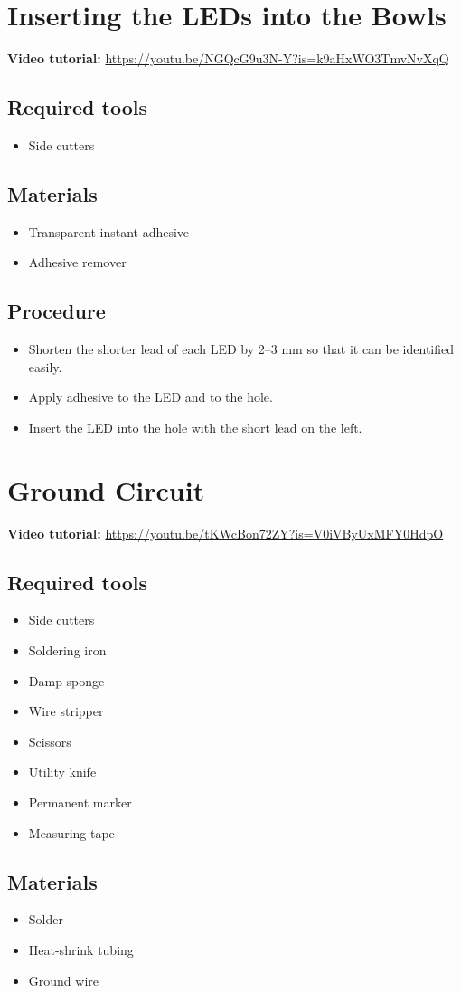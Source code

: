 \documentclass[11pt,a4paper]{article}
\newcommand{\tutorial}[1]{\textbf{Video tutorial:} \url{#1}}
\newcommand{\tools}{\subsection{Required tools}}
\newcommand{\materials}{\subsection{Materials}}
\newcommand{\procedure}{\subsection{Procedure}}
\begin{document}
\section{Inserting the LEDs into the Bowls}
\tutorial{https://youtu.be/NGQcG9u3N-Y?is=k9aHxWO3TmvNvXqQ}

\tools
\begin{itemize}
  \item Side cutters
\end{itemize}

\materials
\begin{itemize}
  \item Transparent instant adhesive
  \item Adhesive remover
\end{itemize}

\procedure
\begin{itemize}
  \item Shorten the shorter lead of each LED by 2--3 mm so that it can be identified easily.
  \item Apply adhesive to the LED and to the hole.
  \item Insert the LED into the hole with the short lead on the left.
\end{itemize}

\section{Ground Circuit}
\tutorial{https://youtu.be/tKWcBon72ZY?is=V0iVByUxMFY0HdpO}

\tools
\begin{itemize}
  \item Side cutters
  \item Soldering iron
  \item Damp sponge
  \item Wire stripper
  \item Scissors
  \item Utility knife
  \item Permanent marker
  \item Measuring tape
\end{itemize}

\materials
\begin{itemize}
  \item Solder
  \item Heat-shrink tubing
  \item Ground wire
\end{itemize}
\end{document}
